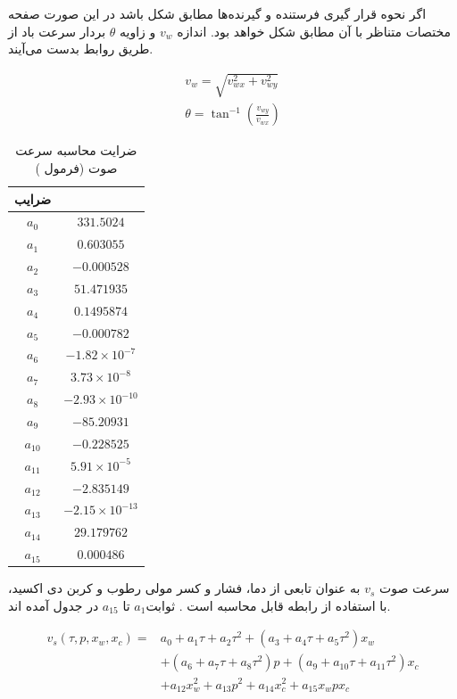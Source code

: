 اگر نحوه قرار گیری فرستنده و گیرنده‌ها مطابق شکل  باشد در این صورت صفحه مختصات متناظر با آن مطابق شکل  خواهد بود. اندازه $v_w$ و زاویه $\theta$ بردار سرعت باد از طریق روابط  بدست می‌آیند.

\begin{equation}\label{eq:windSpeed}
	\begin{split}
		v_w = \sqrt{v_{wx}^2 + v_{wy}^2}\\
		\theta = \tan^{-1}{\left( \frac{v_{wy}}{v_{wx}}\right)}
	\end{split}	
\end{equation}

\begin{table}[!t]
	\centering
	\caption{ضرایت  محاسبه سرعت صوت (فرمول )}
	\label{tb:speedOfSoundcoefficients}
	\begin{tabular}{cc}
		\hline \hline
		 ضرایب & \\
		\hline
		$a_{0}$ & $331.5024$ \\
		$a_{1}$ & $0.603055$ \\
		$a_{2}$ & $-0.000528$ \\
		$a_{3}$ & $51.471935$ \\
		$a_{4}$ & $0.1495874$ \\
		$a_{5}$ & $-0.000782$ \\
		$a_{6}$ & $-1.82 \times 10^{-7}$ \\
		$a_{7}$ & $3.73 \times 10^{-8}$ \\
		$a_{8}$ & $-2.93 \times 10^{-10}$ \\
		$a_{9}$ & $-85.20931$ \\
		$a_{10}$ & $-0.228525$ \\
		$a_{11}$ & $5.91 \times 10^{-5}$ \\
		$a_{12}$ & $-2.835149$ \\
		$a_{13}$ & $-2.15 \times 10^{-13}$ \\
		$a_{14}$ & $29.179762$ \\
		$a_{15}$ & $0.000486$ \\
		\hline
	\end{tabular}
\end{table}

سرعت صوت $v_s$ به عنوان تابعی از دما، فشار و کسر مولی رطوب و کربن دی اکسید، با استفاده از رابطه  قابل محاسبه است . ثوابت$a_1$ تا $a_{15}$ در جدول  آمده اند.

\begin{equation}\label{eq:soundSpeed}
	\begin{aligned}
		v_s\left(\tau, p, x_w, x_{c}\right)=& a_{0}+a_{1} \tau+a_{2} \tau^{2}+\left(a_{3}+a_{4} \tau+a_{5} \tau^{2}\right) x_{w} \\
		&+\left(a_{6}+a_{7} \tau+a_{8} \tau^{2}\right) p+\left(a_{9}+a_{10} \tau+a_{11} \tau^{2}\right) x_{c} \\
		&+a_{12} x_{w}^{2}+a_{13} p^{2}+a_{14} x_{c}^{2}+a_{15} x_w p x_c
	\end{aligned}
\end{equation}

